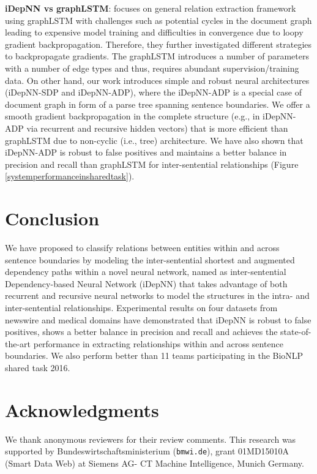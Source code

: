 \documentclass[letterpaper]{article} \usepackage{aaai19}  \usepackage{times}  \usepackage{helvet}  \usepackage{courier}  \usepackage{url}  \usepackage{graphicx}
\begin{document}
{\bf iDepNN vs graphLSTM}: 
\citeauthor{peng2017cross}  focuses on general relation extraction framework using graphLSTM with challenges 
such as potential cycles in the document graph leading to
expensive model training and difficulties in convergence due
to loopy gradient backpropagation.  Therefore, they further
investigated different strategies to backpropagate
gradients. The graphLSTM introduces a number of parameters with a number of
edge types and thus, requires abundant supervision/training
data.  On other hand, our work introduces simple and robust
neural architectures (iDepNN-SDP and iDepNN-ADP), where the
iDepNN-ADP is a special case of document graph in form of a
parse tree spanning sentence boundaries. We offer a smooth
gradient backpropagation in the complete structure (e.g., 
in iDepNN-ADP via recurrent and recursive hidden
vectors) that is more efficient than graphLSTM due to non-cyclic
(i.e., tree) architecture.  We have also shown that
iDepNN-ADP is robust to false positives and maintains a
better balance in precision and recall than graphLSTM for
inter-sentential relationships
(Figure \ref{systemperformanceinsharedtask}).

\section{Conclusion}
\label{conclusion}
We have proposed to classify relations 
between entities within and across sentence boundaries 
by modeling the inter-sentential shortest and augmented dependency
paths within a novel neural network, 
named as inter-sentential Dependency-based Neural Network (iDepNN) that 
takes advantage of both recurrent and recursive neural networks  
to model the structures in the intra- and inter-sentential relationships. 
Experimental results on four datasets from  newswire and medical domains 
have demonstrated that iDepNN is robust to false positives, 
shows 
a better balance in precision and recall and 
achieves the state-of-the-art performance in extracting relationships within and across sentence boundaries. 
We also perform better than 11 teams participating  in the BioNLP shared task 2016. 





\section*{Acknowledgments}
We thank anonymous reviewers for their review comments. 
This research was supported by Bundeswirtschaftsministerium ({\tt bmwi.de}), grant 01MD15010A (Smart Data Web) 
at Siemens AG- CT Machine Intelligence, Munich Germany.

\small





\end{document}
